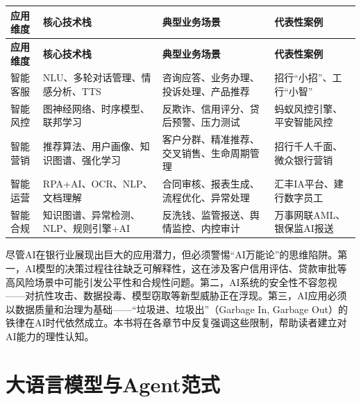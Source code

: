 \vspace{0.5em}

\begin{longtable}{p{2cm} p{3.5cm} p{4cm} p{4.5cm}}
\toprule
\textbf{应用维度} & \textbf{核心技术栈} & \textbf{典型业务场景} & \textbf{代表性案例} \\
\midrule
\endfirsthead

\toprule
\textbf{应用维度} & \textbf{核心技术栈} & \textbf{典型业务场景} & \textbf{代表性案例} \\
\midrule
\endhead

智能客服 & NLU、多轮对话管理、情感分析、TTS & 咨询应答、业务办理、投诉处理、产品推荐 & 招行``小招''、工行``小智'' \\

智能风控 & 图神经网络、时序模型、联邦学习 & 反欺诈、信用评分、贷后预警、压力测试 & 蚂蚁风控引擎、平安智能风控 \\

智能营销 & 推荐算法、用户画像、知识图谱、强化学习 & 客户分群、精准推荐、交叉销售、生命周期管理 & 招行千人千面、微众银行营销 \\

智能运营 & RPA+AI、OCR、NLP、文档理解 & 合同审核、报表生成、流程优化、异常处理 & 汇丰IA平台、建行数字员工 \\

智能合规 & 知识图谱、异常检测、NLP、规则引擎+AI & 反洗钱、监管报送、舆情监控、内控审计 & 万事网联AML、银保监AI报送 \\

\bottomrule
\end{longtable}

\begin{warningbox}[警惕“AI万能论”]
尽管AI在银行业展现出巨大的应用潜力，但必须警惕``AI万能论''的思维陷阱。第一，AI模型的决策过程往往缺乏可解释性，这在涉及客户信用评估、贷款审批等高风险场景中可能引发公平性和合规性问题。第二，AI系统的安全性不容忽视——对抗性攻击、数据投毒、模型窃取等新型威胁正在浮现。第三，AI应用必须以数据质量和治理为基础——``垃圾进、垃圾出''（Garbage In, Garbage Out）的铁律在AI时代依然成立。本书将在各章节中反复强调这些限制，帮助读者建立对AI能力的理性认知。
\end{warningbox}


\section{大语言模型与Agent范式}

